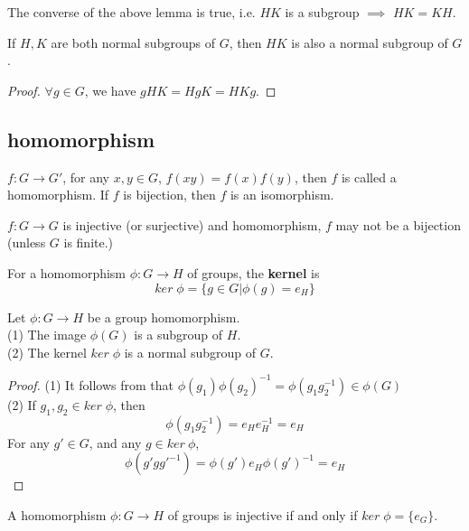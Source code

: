 \documentclass[11pt,fleqn]{book} %
\begin{document}
\begin{CJK}{UTF8}{gkai}
\begin{remark}
	The converse of the above lemma is true, i.e. $HK$ is a subgroup $\implies$ $HK = KH$.
\end{remark}

\begin{lemma}
	If $H, K$ are both normal subgroups of $G$, then $HK$ is also a normal subgroup of $G$.
\end{lemma}
\begin{proof}
	$\forall g \in G$, we have $gHK = HgK = HKg$. 	
\end{proof}

\subsection{homomorphism}
\begin{definition}
	 $f: G \to G'$, for any $x,y \in G$, $f(xy) = f(x)f(y)$, then $f$ is called a homomorphism. If $f$ is bijection, then $f$ is an isomorphism.
\end{definition}
\begin{remark}
	$f: G\to G$ is injective (or surjective) and homomorphism, $f$ may not be a bijection (unless $G$ is finite.)	
\end{remark}

\begin{definition}
	 For a homomorphism $\phi: G \to H$ of groups, the {\bf kernel} is 
	\[ker \;\phi = \{g \in G | \phi(g) = e_H\}\]
\end{definition}

\begin{lemma}
	Let $\phi:G\to H$ be a group homomorphism. \\
	(1) The image $\phi(G)$ is a subgroup of $H$. \\
	(2) The kernel $ker \; \phi$ is a normal subgroup of $G$.
\end{lemma}
\begin{proof}
	(1) It follows from that $\phi(g_1)\phi(g_2)^{-1} = \phi(g_1g_2^{-1}) \in \phi(G)$ \\
	(2) If $g_1, g_2 \in ker \; \phi$, then 
	\[\phi(g_1g_2^{-1}) = e_He_H^{-1} = e_H\]
	For any $g' \in G$, and any $g \in ker \ \phi$, \[\phi(g'gg'^{-1}) = \phi(g')e_H\phi(g')^{-1} = e_H\]  
\end{proof}

\begin{lemma}
	A homomorphism $\phi: G \to H$ of groups is injective if and only if $ker \; \phi = \{e_G\}$.
\end{lemma}


\end{CJK}
\end{document}
